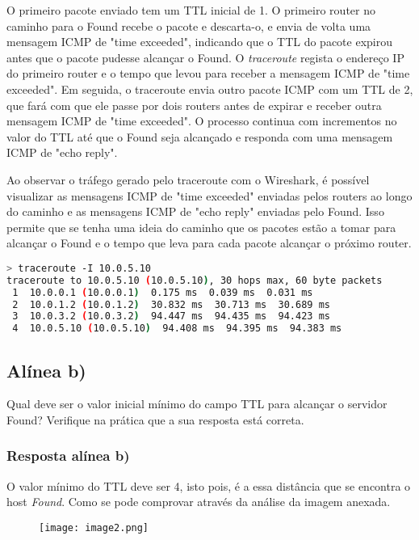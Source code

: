 \documentclass{article}
\begin{document}
O primeiro pacote enviado tem um TTL inicial de 1. O primeiro router no caminho para o Found recebe o pacote e descarta-o, e envia de volta uma mensagem ICMP de "time exceeded", indicando que o TTL do pacote expirou antes que o pacote pudesse alcançar o Found. O \emph{traceroute} regista o endereço IP do primeiro router e o tempo que levou para receber a mensagem ICMP de "time exceeded". Em seguida, o traceroute envia outro pacote ICMP com um TTL de 2, que fará com que ele passe por dois routers antes de expirar e receber outra mensagem ICMP de "time exceeded". O processo continua com incrementos no valor do TTL até que o Found seja alcançado e responda com uma mensagem ICMP de "echo reply".

Ao observar o tráfego gerado pelo traceroute com o Wireshark, é possível visualizar as mensagens ICMP de "time exceeded" enviadas pelos routers ao longo do caminho e as mensagens ICMP de "echo reply" enviadas pelo Found. Isso permite que se tenha uma ideia do caminho que os pacotes estão a tomar para alcançar o Found e o tempo que leva para cada pacote alcançar o próximo router.

\bigskip

\begin{lstlisting}[language=Bash]
> traceroute -I 10.0.5.10   
traceroute to 10.0.5.10 (10.0.5.10), 30 hops max, 60 byte packets
 1  10.0.0.1 (10.0.0.1)  0.175 ms  0.039 ms  0.031 ms
 2  10.0.1.2 (10.0.1.2)  30.832 ms  30.713 ms  30.689 ms
 3  10.0.3.2 (10.0.3.2)  94.447 ms  94.435 ms  94.423 ms
 4  10.0.5.10 (10.0.5.10)  94.408 ms  94.395 ms  94.383 ms 
\end{lstlisting}

\subsection{Alínea b)}

Qual deve ser o valor inicial mínimo do campo TTL para alcançar o servidor Found? Verifique na prática que a
sua resposta está correta.

\subsubsection{Resposta alínea b)}

O valor mínimo do TTL deve ser 4, isto pois, é a essa distância que se encontra o host \emph{Found}.
Como se pode comprovar através da análise da imagem anexada.

\begin{figure}[h]
    \centering
    \texttt{[image: image2.png]}
\end{figure}
\end{document}
